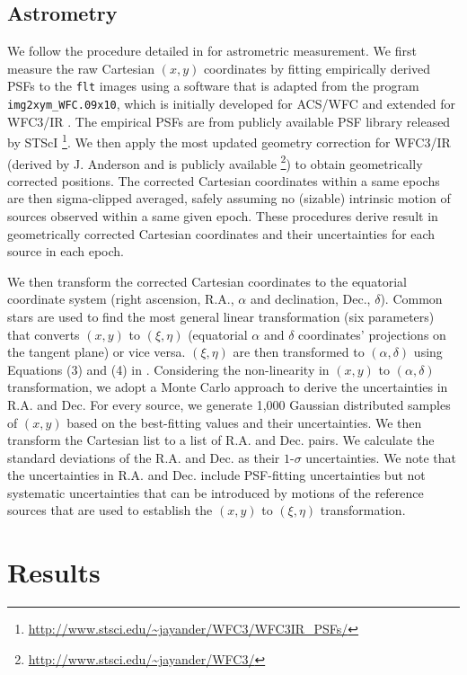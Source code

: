 \documentclass[twocolumn]{aastex62}
\begin{document}
\subsection{Astrometry}
We follow the procedure detailed in \citet{Bedin2018} for astrometric measurement.
We first measure the raw Cartesian $(x, y)$ coordinates by fitting empirically derived PSFs to the \texttt{flt} images using a software that is adapted from the program \texttt{img2xym\_WFC.09x10}, which is initially developed for ACS/WFC \citep{Anderson2006} and extended for WFC3/IR \citep{Bedin2018}. The empirical PSFs are from publicly available PSF library released by STScI \footnote{\url{http://www.stsci.edu/~jayander/WFC3/WFC3IR\_PSFs/}}.  We then apply the most updated geometry correction for WFC3/IR  (derived by J. Anderson and is publicly available \footnote{\url{http://www.stsci.edu/~jayander/WFC3/}}) to obtain geometrically corrected positions. The corrected Cartesian coordinates within a same epochs are then sigma-clipped averaged,  safely assuming no (sizable) intrinsic motion of sources observed within a same given epoch. These procedures derive result in geometrically corrected Cartesian coordinates and their uncertainties for each source in each epoch.

We then transform the corrected Cartesian coordinates to the equatorial coordinate system (right ascension, {R.A.}, $\alpha$ and declination, {Dec.}, $\delta$). Common stars are used to find the most general linear transformation (six parameters) that converts $(x, y)$ to $(\xi,\eta)$ (equatorial $\alpha$ and $\delta$ coordinates' projections on the tangent plane) or vice versa. $(\xi, \eta)$ are then transformed to $(\alpha, \delta)$ using Equations (3) and (4) in \citet{Bedin2018}.
Considering the non-linearity in $(x, y)$ to $(\alpha, \delta)$ transformation, we adopt a Monte Carlo approach to derive the uncertainties in {R.A.} and {Dec.}  For every source, we generate 1,000 Gaussian distributed samples of $(x, y)$  based on the best-fitting values and their uncertainties. We then transform the Cartesian list  to  a list of {R.A.} and {Dec.} pairs. We calculate the standard deviations of the {R.A.} and {Dec.} as their $1$-$\sigma$ uncertainties. We note that the uncertainties in R.A. and Dec. include PSF-fitting uncertainties but not systematic uncertainties that can be introduced by motions of the reference sources that are used to establish the $(x, y)$ to $(\xi,\eta)$ transformation.

\section{Results}
\end{document}
